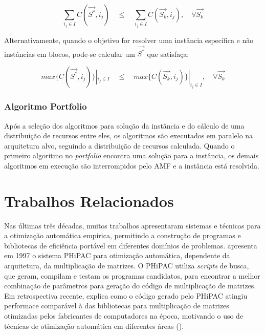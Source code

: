 \documentclass[a4paper, 11pt]{article}
\begin{document}
\begin{equation*}
\sum_{i_j \in I} C(\overrightarrow{S^*},i_j) \quad \leq \quad \sum_{i_j \in I} 
C(\overrightarrow{S_k}, i_j), \quad \forall \overrightarrow{S_k}
\end{equation*}

Alternativamente, quando o objetivo for resolver uma instância específica e 
não instâncias em blocos, pode-se calcular um $\overrightarrow{S^*}$ que
satisfaça:

\begin{equation*}
    max \{C(\overrightarrow{S^*},i_j)\} |_{i_j \in I} \quad \leq \quad
    max \{C(\overrightarrow{S_k}, i_j)\} |_{i_j \in I}, \quad \forall 
    \overrightarrow{S_k}
\end{equation*}

\subsubsection{Algoritmo Portfolio} \label{sec:portfolio}

Após a seleção dos algoritmos para solução da instância e do
cálculo de uma distribuição de recursos entre eles, os algoritmos
são executados em paralelo na arquitetura alvo, seguindo a distribuição
de recursos calculada. Quando o primeiro algoritmo no \emph{portfolio}
encontra uma solução para a instância, os demais algoritmos em execução 
são interrompidos pelo AMF e a instância está resolvida.

\section{Trabalhos Relacionados} \label{sec:trabrel}

Nas últimas três décadas, muitos trabalhos apresentaram sistemas e técnicas 
para a otimização automática empírica, permitindo a construção de programas e 
bibliotecas de eficiência portável em diferentes domínios de problemas.
\citet{bilmes1997} apresenta em 1997 o sistema PHiPAC para otimização
automática, dependente da arquitetura, da multiplicação de matrizes. O PHiPAC
utiliza \emph{scripts} de busca, que geram, compilam e testam os programas
candidatos, para encontrar a melhor combinação de parâmetros para geração do 
código de multiplicação de matrizes. Em retrospectiva recente, 
\citet{bilmes2014phipacretro} explica como o código gerado pelo PHiPAC atingiu
performace comparável à das bibliotecas para multiplicação de matrizes 
otimizadas pelos fabricantes de computadores na época, motivando o uso de
técnicas de otimização automática em diferentes áreas 
(\citet{demmel2009accelerating}).
\end{document}

